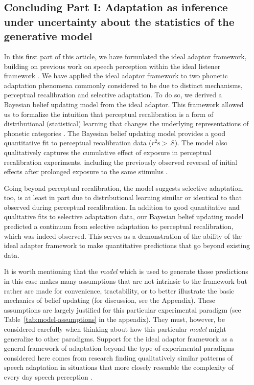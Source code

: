 \subsection{Concluding Part I: Adaptation as inference under uncertainty about the statistics of the generative model} 
\label{sec:conclusion-part1}

In this first part of this article, we have formulated the ideal adaptor framework, building on previous work on speech perception within the ideal listener framework \autocite{Clayards2008,Feldman2009a,Norris2008,Sonderegger2010}. We have applied the ideal adaptor framework to two phonetic adaptation phenomena commonly considered to be due to distinct mechanisms, perceptual recalibration and selective adaptation. To do so, we derived a Bayesian belief updating model from the ideal adaptor. This framework allowed us to formalize the intuition that perceptual recalibration is a form of distributional (statistical) learning that changes the underlying representations of phonetic categories \autocite[e.g.,][]{Norris2003,Kraljic2005,Maye2008a,Bertelson2003}. The Bayesian belief updating model provides a good quantitative fit to perceptual recalibration data ($r^2\mathrm{s}> .8$). The model also qualitatively captures the cumulative effect of exposure in perceptual recalibration experiments, including the previously observed reversal of initial effects after prolonged exposure to the same stimulus \autocite{Vroomen2007}.

Going beyond perceptual recalibration, the model suggests selective adaptation, too, is at least in part due to distributional learning similar or identical to that observed during perceptual recalibration. In addition to good quantitative and qualitative fits to selective adaptation data, our Bayesian belief updating model predicted a continuum from selective adaptation to perceptual recalibration, which was indeed observed. This serves as a demonstration of the ability of the ideal adapter framework to make quantitative predictions that go beyond existing data.

It is worth mentioning that the \emph{model} which is used to generate those predictions in this case makes many assumptions that are not intrinsic to the framework but rather are made for convenience, tractability, or to better illustrate the basic mechanics of belief updating (for discussion, see the Appendix). These assumptions are largely justified for this particular experimental paradigm (see Table~\ref{tab:model-assumptions} in the appendix). They must, however, be considered carefully when thinking about how this particular \emph{model} might generalize to other paradigms. Support for the ideal adaptor framework as a general framework of adaptation beyond the type of experimental paradigms considered here comes from research finding qualitatively similar patterns of speech adaptation in situations that more closely resemble the complexity of every day speech perception \autocite{Eisner2006,Reinisch2014}.

